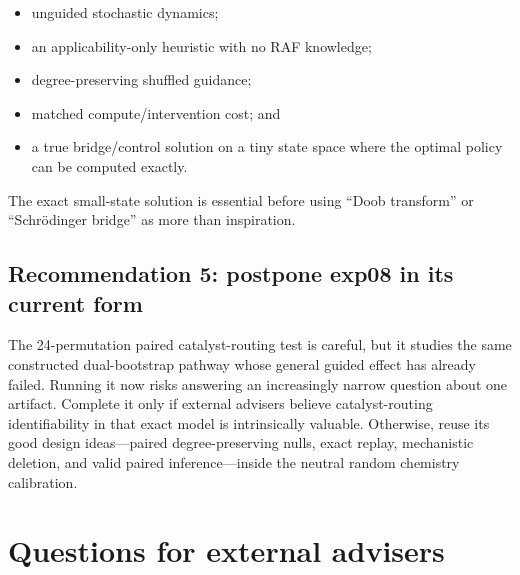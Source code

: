 \documentclass[11pt]{article}
\begin{document}
\begin{itemize}
\item unguided stochastic dynamics;
\item an applicability-only heuristic with no RAF knowledge;
\item degree-preserving shuffled guidance;
\item matched compute/intervention cost; and
\item a true bridge/control solution on a tiny state space where the optimal
  policy can be computed exactly.
\end{itemize}

The exact small-state solution is essential before using ``Doob transform'' or
``Schr\"odinger bridge'' as more than inspiration.

\subsection{Recommendation 5: postpone exp08 in its current form}

The 24-permutation paired catalyst-routing test is careful, but it studies the
same constructed dual-bootstrap pathway whose general guided effect has already
failed.  Running it now risks answering an increasingly narrow question about
one artifact.  Complete it only if external advisers believe catalyst-routing
identifiability in that exact model is intrinsically valuable.  Otherwise,
reuse its good design ideas---paired degree-preserving nulls, exact replay,
mechanistic deletion, and valid paired inference---inside the neutral random
chemistry calibration.

\section{Questions for external advisers}
\end{document}

